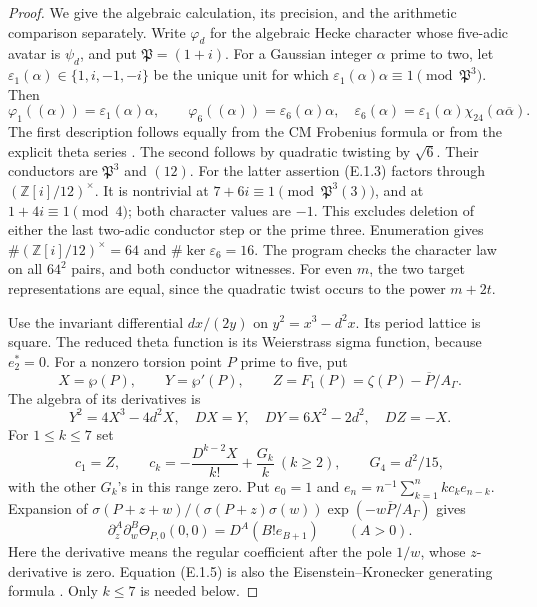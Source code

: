 \begin{proof}
We give the algebraic calculation, its precision, and the
arithmetic comparison separately. Write \(\varphi_d\) for
the algebraic Hecke character whose five-adic avatar is
\(\psi_d\), and put \(\mathfrak P=(1+i)\).
For a Gaussian integer \(\alpha\) prime to two, let
\(\varepsilon_1(\alpha)\in\{1,i,-1,-i\}\) be the unique unit
for which \(\varepsilon_1(\alpha)\alpha\equiv1\pmod{\mathfrak P^3}\).
Then
\[
 \varphi_1((\alpha))=\varepsilon_1(\alpha)\alpha,
 \qquad
 \varphi_6((\alpha))=\varepsilon_6(\alpha)\alpha,
 \quad
 \varepsilon_6(\alpha)=\varepsilon_1(\alpha)
                  \chi_{24}(\alpha\overline\alpha).             \tag{E.1.3}
\]
The first description follows equally from the CM Frobenius
formula or from the explicit theta series
\cite[\S3, pp.15--16]{DE_LiLongTu2018}. The second follows by
quadratic twisting by \(\sqrt6\).
Their conductors are \(\mathfrak P^3\) and \((12)\).
For the latter assertion (E.1.3) factors through
\((\mathbb Z[i]/12)^\times\). It is nontrivial at
\(7+6i\equiv1\pmod{\mathfrak P^3(3)}\), and at
\(1+4i\equiv1\pmod4\); both character values are \(-1\).
This excludes deletion of either the last two-adic conductor
step or the prime three. Enumeration gives
\(\#(\mathbb Z[i]/12)^\times=64\) and
\(\#\ker\varepsilon_6=16\). The program checks the character
law on all \(64^2\) pairs, and both conductor witnesses.
For even \(m\), the two target representations are equal,
since the quadratic twist occurs to the power \(m+2t\).

Use the invariant differential \(dx/(2y)\) on
\(y^2=x^3-d^2x\). Its period lattice is square. The reduced
theta function is its Weierstrass sigma function, because
\(e_2^*=0\). For a nonzero torsion point \(P\) prime to five,
put
\[
 X=\wp(P),\qquad Y=\wp'(P),\qquad
 Z=F_1(P)=\zeta(P)-\overline P/A_\Gamma.
\]
The algebra of its derivatives is
\[
 Y^2=4X^3-4d^2X,\quad
 DX=Y,\quad DY=6X^2-2d^2,\quad DZ=-X.                    \tag{E.1.4}
\]
For \(1\le k\le7\) set
\[
 c_1=Z,\qquad
 c_k=-\frac{D^{k-2}X}{k!}+\frac{G_k}{k}\ (k\ge2),\qquad
 G_4=d^2/15,
\]
with the other \(G_k\)'s in this range zero. Put \(e_0=1\)
and \(e_n=n^{-1}\sum_{k=1}^n k c_k e_{n-k}\).
Expansion of
\(\sigma(P+z+w)/(\sigma(P+z)\sigma(w))
\exp(-w\overline P/A_\Gamma)\) gives
\[
 \partial_z^A\partial_w^B\Theta_{P,0}(0,0)
       =D^A(B!e_{B+1})\qquad(A>0).                       \tag{E.1.5}
\]
Here the derivative means the regular coefficient after the
pole \(1/w\), whose \(z\)-derivative is zero. Equation
(E.1.5) is also the Eisenstein--Kronecker generating formula
\cite[Theorem 1.17]{DE_BannaiKobayashi2007}. Only \(k\le7\)
is needed below.


\end{proof}
